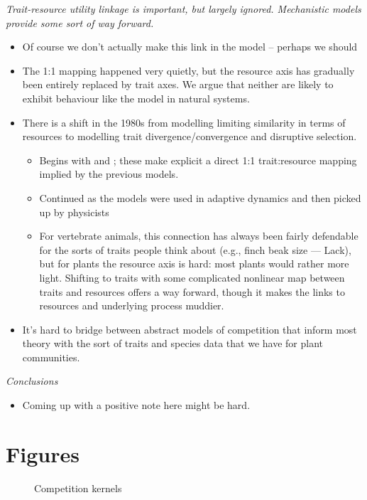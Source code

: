 \documentclass[a4paper,11pt]{article}
\begin{document}
\begin{itemize}
\textit{Trait-resource utility linkage is important, but largely
  ignored.  Mechanistic models provide some sort of way forward.}
\begin{itemize}
\item Of course we don't actually make this link in the model --
  perhaps we should
\item The 1:1 mapping happened very quietly, but the resource axis has
  gradually been entirely replaced by trait axes.  We argue that
  neither are likely to exhibit behaviour like the
  \citet{MacArthur-1967} model in natural systems.
\item There is a shift in the 1980s from modelling limiting
  similarity in terms of resources to modelling trait
  divergence/convergence and disruptive selection.
  \begin{itemize}
  \item Begins with \citet{Taper-1985} and \citet{Brown-1987-140}; these
    make explicit a direct 1:1 trait:resource mapping implied by the
    previous models.
  \item Continued as the models were used in adaptive dynamics
    \citep[e.g.,][]{Dieckmann-1999} and then picked up by physicists
    \citep[e.g.,][]{Leimar-2013}
  \item For vertebrate animals, this connection has always been fairly
    defendable for the sorts of traits people think about (e.g., finch
    beak size --- Lack), but for plants the resource axis is hard: most
    plants would rather more light.  Shifting to traits with some
    complicated nonlinear map between traits and resources offers a way
    forward, though it makes the links to resources and underlying
    process muddier.
  \end{itemize}
\item It's hard to bridge between abstract models of competition that
  inform most theory with the sort of traits and species data that we
  have for plant communities.
\end{itemize}

\textit{Conclusions}
\begin{itemize}
\item Coming up with a positive note here might be hard.
\end{itemize}

\section{Figures}

\begin{figure}[h]
  \centering
  \caption{Competition kernels}
  \label{fig:competition-kernels}
\end{figure}


\end{itemize}
\end{document}
